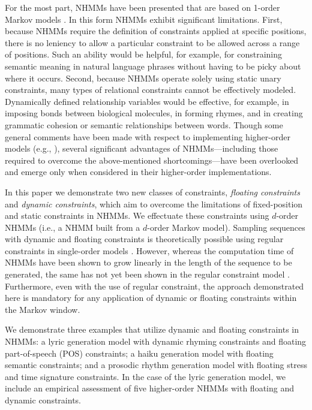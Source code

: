 \documentclass[phd,electronic,oneside,twosidetoc,letterpaper,chaptercenter,parttop,lof,lot]{byumsphd}
\begin{document}
For the most part, NHMMs have been presented that are based on 1-order Markov models \cite{barbieri2012markov,roy2013enforcing,papadopoulos2015exact}. In this form NHMMs exhibit significant limitations. First, because NHMMs require the definition of constraints applied at specific positions, there is no leniency to allow a particular constraint to be allowed across a range of positions. Such an ability would be helpful, for example, for constraining semantic meaning in natural language phrases without having to be picky about where it occurs. Second, because NHMMs operate solely using static unary constraints, many types of relational constraints cannot be effectively modeled. Dynamically defined relationship variables would be effective, for example, in imposing bonds between biological molecules, in forming rhymes, and in creating grammatic cohesion or semantic relationships between words. Though some general comments have been made with respect to implementing higher-order models (e.g., \cite{pachet2011finite}), several significant advantages of NHMMs---including those required to overcome the above-mentioned shortcomings---have been overlooked and emerge only when considered in their higher-order implementations.

In this paper we demonstrate two new classes of constraints, \textit{floating constraints} and \textit{dynamic constraints}, which aim to overcome the limitations of fixed-position and static constraints in NHMMs. We effectuate these constraints using $d$-order NHMMs (i.e., a NHMM built from a $d$-order Markov model). Sampling sequences with dynamic and floating constraints is theoretically possible using regular constraints in single-order models \cite{pesant2004regular,papadopoulos2014avoiding,papadopoulos2015exact,bodily2018relational}. However, whereas the computation time of NHMMs have been shown to grow linearly in the length of the sequence to be generated, the same has not yet been shown in the regular constraint model \cite{bodily2018relational}. Furthermore, even with the use of regular constraint, the approach demonstrated here is mandatory for any application of dynamic or floating constraints within the Markov window.

We demonstrate three examples that utilize dynamic and floating constraints in NHMMs: a lyric generation model with dynamic rhyming constraints and floating part-of-speech (POS) constraints; a haiku generation model with floating semantic constraints; and a prosodic rhythm generation model with floating stress and time signature constraints. In the case of the lyric generation model, we include an empirical assessment of five higher-order NHMMs with floating and dynamic constraints.
\end{document}
